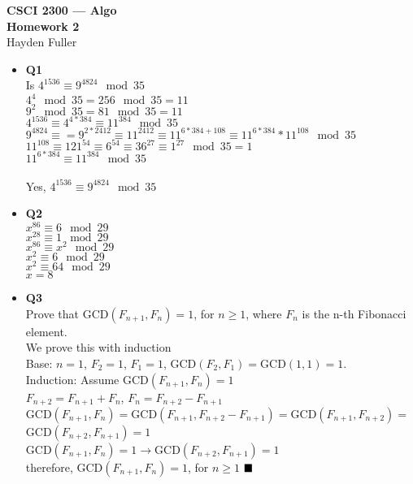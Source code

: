 \documentclass[11pt]{article}
\def\imp{\rightarrow}
\begin{document}
\thispagestyle{empty}   %

\begin{center}
\large
\textbf{CSCI 2300 --- Algo \\
Homework 2}
\\Hayden Fuller
\end{center}

\begin{itemize}

\item \textbf{Q1} 
\\Is $4^{1536}\equiv9^{4824}\mod35$
\\$4^4\mod35=256\mod35=11$
\\$9^2\mod35=81\mod35=11$
\\$4^{1536}\equiv4^{4*384}\equiv11^384\mod35$
\\$9^{4824}\equiv=9^{2*2412}\equiv11^{2412}\equiv11^{6*384+108}\equiv11^{6*384}*11^{108}\mod35$
\\$11^{108}\equiv121^{54}\equiv6^{54}\equiv36^{27}\equiv1^27\mod35=1$
\\$11^{6*384}\equiv11^{384}\mod35$
\\
\\Yes, $4^{1536}\equiv9^{4824}\mod35$

\vspace{0.1in}

\item \textbf{Q2} 
\\$x^{86}\equiv6\mod29$
\\$x^{28}\equiv1\mod29$
\\$x^{86}\equiv x^2\mod29$
\\$x^2\equiv6\mod29$
\\$x^2\equiv64\mod29$
\\$x=8$
\vspace{0.1in}

\item \textbf{Q3} 
\\Prove that GCD$(F_{n+1},F_n)=1$, for $n\ge1$, where $F_n$ is the n-th Fibonacci element.
\\We prove this with induction
\\Base: $n=1$, $F_2=1$, $F_1=1$, GCD$(F_2,F_1)=$GCD$(1,1)=1$.
\\Induction: Assume GCD$(F_{n+1},F_n)=1$
\\$F_{n+2}=F_{n+1}+F_n$, $F_n=F_{n+2}-F_{n+1}$
\\GCD$(F_{n+1},F_{n})=$GCD$(F_{n+1},F_{n+2}-F_{n+1})=$GCD$(F_{n+1},F_{n+2})=$GCD$(F_{n+2},F_{n+1})=1$
\\GCD$(F_{n+1},F_n)=1\imp$GCD$(F_{n+2},F_{n+1})=1$
\\therefore, GCD$(F_{n+1},F_n)=1$, for $n\ge1$ $\hfill{\blacksquare}$

\end{itemize}
\end{document}
